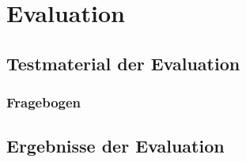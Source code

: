 \documentclass[Bachelorarbeit.tex]{subfiles}
\begin{document}
\chapter{Evaluation}
\label{anhangEvaluation}

\section{Testmaterial der Evaluation}
\label{anhangTestmaterial}

\subsection{Fragebogen}
\label{anhangFragebogen}


\section{Ergebnisse der Evaluation}
\label{anhangErgebnisse}
\end{document}

